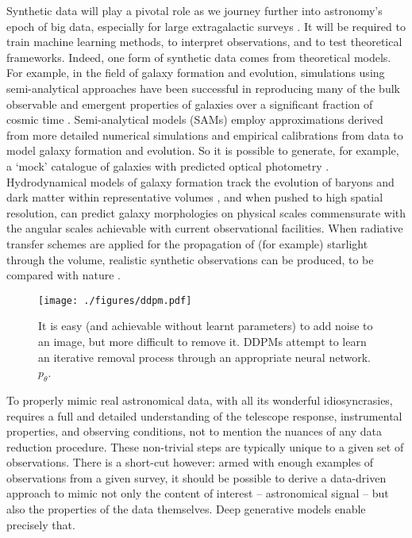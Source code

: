 \documentclass[fleqn,usenatbib]{mnras}
\begin{document}
Synthetic data will play a pivotal role as we journey further into astronomy's
epoch of big data, especially for large extragalactic surveys
\citep{cite_sdss,cite_ska,cite_euclid,cite_lsst}.  It will be required to train
machine learning methods, to interpret observations, and to test theoretical
frameworks. Indeed, one form of synthetic data comes from theoretical models.
For example, in the field of galaxy formation and evolution, simulations using
semi-analytical approaches have been successful in reproducing many of the bulk
observable and emergent properties of galaxies over a significant fraction of
cosmic time
\citep[e.g.][]{cite_somerville1999,cite_cole2000,cite_bower2006,cite_croton2006}.
Semi-analytical models (SAMs) employ approximations derived from more detailed
numerical simulations and empirical calibrations from data to model galaxy
formation and evolution. So it is possible to generate, for example, a `mock'
catalogue of galaxies with predicted optical photometry \citep{cite_lagos2019}.
Hydrodynamical models of galaxy formation track the evolution of baryons and
dark matter within representative volumes
\citep[e.g.][]{cite_dubois2014,cite_vogelsberger2014,cite_eagle,cite_khandai2015,cite_kaviraj2017},
and when pushed to high spatial resolution, can predict galaxy morphologies on
physical scales commensurate with the angular scales achievable with current
observational facilities. When radiative transfer schemes are applied for the
propagation of (for example) starlight through the volume, realistic synthetic
observations can be produced, to be compared with nature
\citep[e.g.][]{cite_camps2016,cite_trayford2017,cite_lovell2021}.

\begin{figure*}
    \texttt{[image: ./figures/ddpm.pdf]}
    \caption{It is easy (and achievable without learnt parameters) to add noise
    to an image, but more difficult to remove it. DDPMs attempt to learn an
    iterative removal process through an appropriate neural network.
    $p_\theta$.}
    \label{fig_ddpm}
\end{figure*}
   
To properly mimic real astronomical data, with all its wonderful
idiosyncrasies, requires a full and detailed understanding of the telescope
response, instrumental properties, and observing conditions, not to mention the
nuances of any data reduction procedure. These non-trivial steps are
typically unique to a given set of observations. There is a short-cut however:
armed with enough examples of observations from a given survey, it should be
possible to derive a data-driven approach to mimic not only the content of
interest -- astronomical signal -- but also the properties of the data themselves.
Deep generative models enable precisely that.
\end{document}
